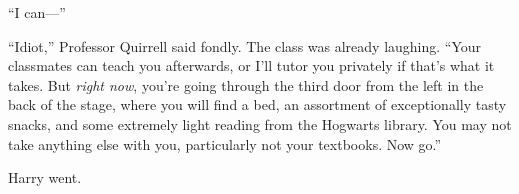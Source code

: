 “I can—”

“Idiot,” Professor Quirrell said fondly. The class was already laughing. “Your classmates can teach you afterwards, or I’ll tutor you privately if that’s what it takes. But \emph{right now}, you’re going through the third door from the left in the back of the stage, where you will find a bed, an assortment of exceptionally tasty snacks, and some extremely light reading from the Hogwarts library. You may not take anything else with you, particularly not your textbooks. Now go.”

Harry went.

